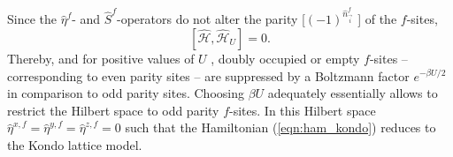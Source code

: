 \documentclass{SciPost}
\begin{document}
 Since the $\hat{\eta}^{f} $- and $ \hat{S}^{f} $-operators  do not alter the  parity [$(-1)^{\hat{n}^{f}_{\vec{i}}}$ ] of the $f$-sites, 
 \begin{equation}
 	\left[  \hat{\mathcal{H}}, \hat{\mathcal{H}}_U \right] = 0.
 \end{equation}
 Thereby,  and for positive values of $U$ ,  doubly occupied  or empty $f$-sites -- corresponding to even parity sites -- are suppressed  by a  Boltzmann factor 
 $e^{-\beta U/2} $ in comparison to odd parity sites.   Choosing $\beta U $ adequately essentially allows to  restrict the Hilbert space to  odd parity $f$-sites.  
 In this Hilbert space $\hat{\eta}^{x,f} = \hat{\eta}^{y,f} =  \hat{\eta}^{z,f} =0$  such that the Hamiltonian (\ref{eqn:ham_kondo}) reduces to the Kondo lattice model. 
%
\end{document}
